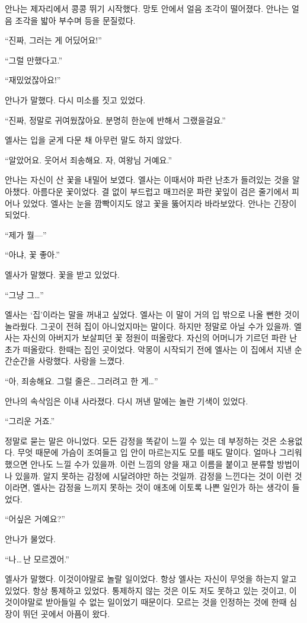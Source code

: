 안나는 제자리에서 콩콩 뛰기 시작했다. 망토 안에서 얼음 조각이 떨어졌다. 안나는 얼음 조각을 밟아 부수며 등을 문질렀다.

``진짜, 그러는 게 어딨어요!''

``그럴 만했다고.''

``재밌었잖아요!''

안나가 말했다. 다시 미소를 짓고 있었다.

``진짜, 정말로 귀여웠잖아요. 분명히 한눈에 반해서 그랬을걸요.''

엘사는 입을 굳게 다문 채 아무런 말도 하지 않았다.

``알았어요. 웃어서 죄송해요. 자, 여왕님 거예요.''

안나는 자신이 산 꽃을 내밀어 보였다. 엘사는 이때서야 파란 난초가 들려있는 것을 알아챘다. 아름다운 꽃이었다. 결 없이 부드럽고 매끄러운 파란 꽃잎이 검은 줄기에서 피어나 있었다. 엘사는 눈을 깜빡이지도 않고 꽃을 뚫어지라 바라보았다. 안나는 긴장이 되었다.

``제가 뭘—''

``아냐, 꽃 좋아.''

엘사가 말했다. 꽃을 받고 있었다.

``그냥 그\ldots''

엘사는 `집'이라는 말을 꺼내고 싶었다. 엘사는 이 말이 거의 입 밖으로 나올 뻔한 것이 놀라웠다. 그곳이 전혀 집이 아니었지마는 말이다. 하지만 정말로 아닐 수가 있을까. 엘사는 자신의 아버지가 보살피던 꽃 정원이 떠올랐다. 자신의 어머니가 기르던 파란 난초가 떠올랐다. 한때는 집인 곳이었다. 악몽이 시작되기 전에 엘사는 이 집에서 지낸 순간순간을 사랑했다. 사랑을 느꼈다.

``아, 죄송해요. 그럴 줄은\ldots\,그러려고 한 게\ldots''

안나의 속삭임은 이내 사라졌다. 다시 꺼낸 말에는 놀란 기색이 있었다.

``그리운 거죠.''

정말로 묻는 말은 아니었다. 모든 감정을 똑같이 느낄 수 있는 데 부정하는 것은 소용없다. 무엇 때문에 가슴이 조여들고 입 안이 마르는지도 모를 때도 말이다. 얼마나 그리워했으면 안나도 느낄 수가 있을까. 이런 느낌의 양을 재고 이름을 붙이고 분류할 방법이나 있을까. 알지 못하는 감정에 시달려야만 하는 것일까. 감정을 느낀다는 것이 이런 것이라면, 엘사는 감정을 느끼지 못하는 것이 애초에 이토록 나쁜 일인가 하는 생각이 들었다.

``어 싶은 거예요?''

안나가 물었다.

``나\ldots\,난 모르겠어.''

엘사가 말했다. 이것이야말로 놀랄 일이었다. 항상 엘사는 자신이 무엇을 하는지 알고 있었다. 항상 통제하고 있었다. 통제하지 않는 것은 이도 저도 못하고 있는 것이고, 이것이야말로 받아들일 수 없는 일이었기 때문이다. 모르는 것을 인정하는 것에 한때 심장이 뛰던 곳에서 아픔이 왔다.


